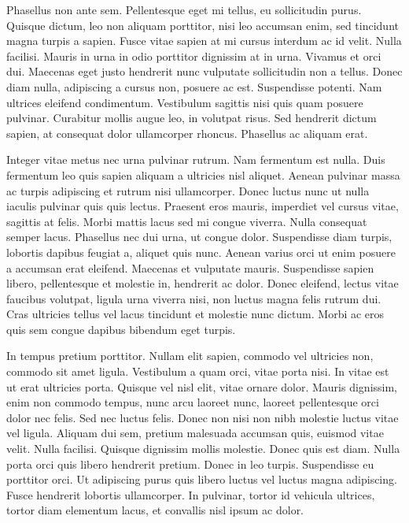 Phasellus non ante sem.
Pellentesque eget mi tellus, eu sollicitudin purus.
Quisque dictum, leo non aliquam porttitor, nisi leo accumsan enim, sed tincidunt magna turpis a sapien.
Fusce vitae sapien at mi cursus interdum ac id velit.
Nulla facilisi.
Mauris in urna in odio porttitor dignissim at in urna.
Vivamus et orci dui.
Maecenas eget justo hendrerit nunc vulputate sollicitudin non a tellus.
Donec diam nulla, adipiscing a cursus non, posuere ac est.
Suspendisse potenti.
Nam ultrices eleifend condimentum.
Vestibulum sagittis nisi quis quam posuere pulvinar.
Curabitur mollis augue leo, in volutpat risus.
Sed hendrerit dictum sapien, at consequat dolor ullamcorper rhoncus.
Phasellus ac aliquam erat.

Integer vitae metus nec urna pulvinar rutrum.
Nam fermentum est nulla.
Duis fermentum leo quis sapien aliquam a ultricies nisl aliquet.
Aenean pulvinar massa ac turpis adipiscing et rutrum nisi ullamcorper.
Donec luctus nunc ut nulla iaculis pulvinar quis quis lectus.
Praesent eros mauris, imperdiet vel cursus vitae, sagittis at felis.
Morbi mattis lacus sed mi congue viverra.
Nulla consequat semper lacus.
Phasellus nec dui urna, ut congue dolor.
Suspendisse diam turpis, lobortis dapibus feugiat a, aliquet quis nunc.
Aenean varius orci ut enim posuere a accumsan erat eleifend.
Maecenas et vulputate mauris.
Suspendisse sapien libero, pellentesque et molestie in, hendrerit ac dolor.
Donec eleifend, lectus vitae faucibus volutpat, ligula urna viverra nisi, non luctus magna felis rutrum dui.
Cras ultricies tellus vel lacus tincidunt et molestie nunc dictum.
Morbi ac eros quis sem congue dapibus bibendum eget turpis.

In tempus pretium porttitor.
Nullam elit sapien, commodo vel ultricies non, commodo sit amet ligula.
Vestibulum a quam orci, vitae porta nisi.
In vitae est ut erat ultricies porta.
Quisque vel nisl elit, vitae ornare dolor.
Mauris dignissim, enim non commodo tempus, nunc arcu laoreet nunc, laoreet pellentesque orci dolor nec felis.
Sed nec luctus felis.
Donec non nisi non nibh molestie luctus vitae vel ligula.
Aliquam dui sem, pretium malesuada accumsan quis, euismod vitae velit.
Nulla facilisi.
Quisque dignissim mollis molestie.
Donec quis est diam.
Nulla porta orci quis libero hendrerit pretium.
Donec in leo turpis.
Suspendisse eu porttitor orci.
Ut adipiscing purus quis libero luctus vel luctus magna adipiscing.
Fusce hendrerit lobortis ullamcorper.
In pulvinar, tortor id vehicula ultrices, tortor diam elementum lacus, et convallis nisl ipsum ac dolor.

